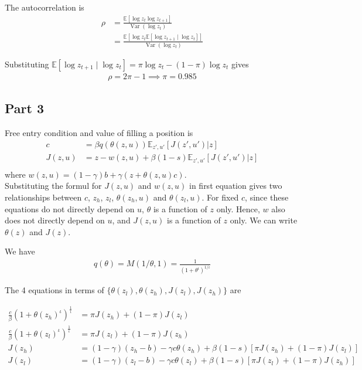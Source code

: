 The autocorrelation is 
\begin{align*}
    \rho &= \frac{\mathbb{E}[\log z_t \log z_{t+1}]}{\operatorname{Var}(\log z_t)} \\
    &= \frac{\mathbb{E}\left[ \log z_t \mathbb{E}[\log z_{t+1} \mid \log z_t] \right]}{\operatorname{Var}(\log z_t)}
\end{align*}

Substituting $\mathbb{E}[\log z_{t+1} \mid \log z_t] = \pi \log z_t - (1-\pi)\log z_t$ gives
\begin{align*}
    \rho = 2\pi - 1 \implies \pi = 0.985
\end{align*}

\subsection*{Part 3}

Free entry condition and value of filling a position is 
\begin{align*}
c &= \beta q(\theta(z,u)) \mathbb{E}_{z',u'} [J(z',u')|z] \\
J(z,u) &= z - w(z,u) + \beta(1-s) \mathbb{E}_{z',u'} [J(z',u')|z] \\
\end{align*}
where $w(z,u) = (1-\gamma)b + \gamma(z + \theta(z,u)c)$.\\

Substituting the formul for $J(z,u)$ and $w(z,u)$ in first equation gives two relationships between $c$, $z_h$, $z_l$, $\theta(z_h, u)$ and $\theta(z_l, u)$. For fixed $c$, since these equations do not directly depend on $u$, $\theta$ is a function of $z$ only. Hence, $w$ also does not directly depend on $u$, and $J(z,u)$ is a function of $z$ only. We can write $\theta(z)$ and $J(z)$.

We have
\begin{align*}
    q(\theta) = M(1/\theta, 1) =  \frac{1}{(1+\theta^\iota)^{1/\iota}}   
\end{align*}

The 4 equations in terms of $\{\theta(z_l ), \theta(z_h), J(z_l ), J(z_h)\}$ are

\begin{align*}
    \frac{c}{\beta } (1+\theta(z_h)^\iota)^\frac{1}{\iota} &= \pi J(z_h) + (1-\pi) J(z_l) \\
    \frac{c}{\beta } (1+\theta(z_l)^\iota)^\frac{1}{\iota} &= \pi J(z_l) + (1-\pi) J(z_h) \\
    J(z_h) &= (1-\gamma)(z_h - b) - \gamma c \theta(z_h) + \beta (1-s)[\pi J(z_h) + (1-\pi) J(z_l)]\\
    J(z_l) &= (1-\gamma)(z_l - b) - \gamma c \theta(z_l) + \beta (1-s)[\pi J(z_l) + (1-\pi) J(z_h)]\\    
\end{align*}


